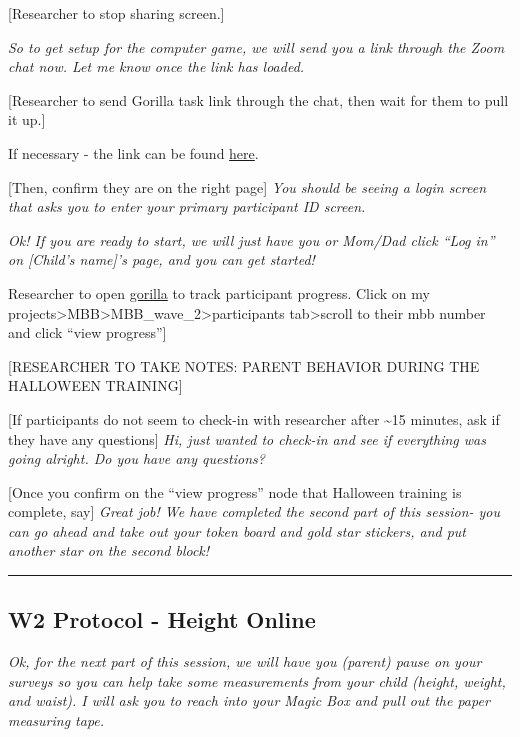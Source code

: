 \documentclass[]{book}
\begin{document}
{[}Researcher to stop sharing screen.{]}

\emph{So to get setup for the computer game, we will send you a link through the Zoom chat now. Let me know once the link has loaded.}

{[}Researcher to send Gorilla task link through the chat, then wait for them to pull it up.{]}

If necessary - the link can be found \href{https://research.sc/participant/login/39409/publicid}{here}.

{[}Then, confirm they are on the right page{]} \emph{You should be seeing a login screen that asks you to enter your primary participant ID screen.}

\emph{Ok! If you are ready to start, we will just have you or Mom/Dad click ``Log in'' on {[}Child's name{]}'s page, and you can get started!}

Researcher to open \href{https://gorilla.sc}{gorilla} to track participant progress. Click on my projects\textgreater{}MBB\textgreater{}MBB\_wave\_2\textgreater{}participants tab\textgreater{}scroll to their mbb number and click ``view progress''{]}

{[}RESEARCHER TO TAKE NOTES: PARENT BEHAVIOR DURING THE HALLOWEEN TRAINING{]}

{[}If participants do not seem to check-in with researcher after \textasciitilde{}15 minutes, ask if they have any questions{]} \emph{Hi, just wanted to check-in and see if everything was going alright. Do you have any questions?}

{[}Once you confirm on the ``view progress'' node that Halloween training is complete, say{]} \emph{Great job! We have completed the second part of this session- you can go ahead and take out your token board and gold star stickers, and put another star on the second block!}

\begin{center}\rule{0.5\linewidth}{0.5pt}\end{center}

\hypertarget{w2-protocol---height-online}{%
\subsection{W2 Protocol - Height Online}\label{w2-protocol---height-online}}

\emph{Ok, for the next part of this session, we will have you (parent) pause on your surveys so you can help take some measurements from your child (height, weight, and waist). I will ask you to reach into your Magic Box and pull out the paper measuring tape.}
\end{document}
